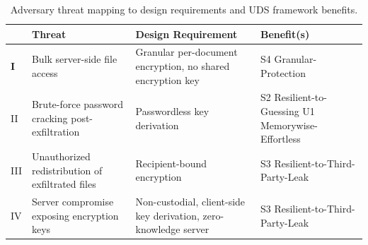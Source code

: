 ﻿\begin{table}[htbp]
    \centering
    \renewcommand{\arraystretch}{1.5} 
    \caption{Adversary threat mapping to design requirements and UDS framework benefits.}
    \label{tab:threat_mapping}
    \begin{tabularx}{\textwidth}{
        >{\bfseries\centering\arraybackslash}m{0.75cm}
        >{\raggedright\arraybackslash}X
        >{\raggedright\arraybackslash}X
        >{\raggedright\arraybackslash}X
    }
        \toprule
        & \textbf{Threat} & \textbf{Design Requirement} & \textbf{Benefit(s)} \\
        \midrule
        
        I & Bulk server-side file access & Granular per-document encryption, no shared encryption key & S4 Granular-Protection \\
        
        \arrayrulecolor{gray!40}\midrule\arrayrulecolor{black} 
        
        II & Brute-force password cracking post-exfiltration & Passwordless key derivation & S2 Resilient-to-Guessing \newline U1 Memorywise-Effortless \\
        
        \arrayrulecolor{gray!40}\midrule\arrayrulecolor{black}
        
        III & Unauthorized redistribution of exfiltrated files & Recipient-bound encryption & S3 Resilient-to-Third-Party-Leak \\
        
        \arrayrulecolor{gray!40}\midrule\arrayrulecolor{black}
        
        IV & Server compromise exposing encryption keys & Non-custodial, client-side key derivation, zero-knowledge server & S3 Resilient-to-Third-Party-Leak \\
        
        \bottomrule
    \end{tabularx}
\end{table}
